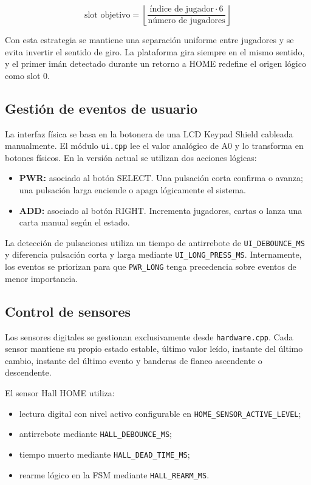 \[
\text{slot objetivo} = \left\lfloor \frac{\text{índice de jugador} \cdot 6}{\text{número de jugadores}} \right\rfloor
\]

Con esta estrategia se mantiene una separación uniforme entre jugadores y se evita invertir el sentido de giro. La plataforma gira siempre en el mismo sentido, y el primer imán detectado durante un retorno a HOME redefine el origen lógico como slot 0.

\subsection{Gestión de eventos de usuario}

La interfaz física se basa en la botonera de una LCD Keypad Shield cableada manualmente. El módulo \texttt{ui.cpp} lee el valor analógico de A0 y lo transforma en botones físicos. En la versión actual se utilizan dos acciones lógicas:

\begin{itemize}
    \item \textbf{PWR:} asociado al botón SELECT. Una pulsación corta confirma o avanza; una pulsación larga enciende o apaga lógicamente el sistema.
    \item \textbf{ADD:} asociado al botón RIGHT. Incrementa jugadores, cartas o lanza una carta manual según el estado.
\end{itemize}

La detección de pulsaciones utiliza un tiempo de antirrebote de \texttt{UI\_DEBOUNCE\_MS} y diferencia pulsación corta y larga mediante \texttt{UI\_LONG\_PRESS\_MS}. Internamente, los eventos se priorizan para que \texttt{PWR\_LONG} tenga precedencia sobre eventos de menor importancia.

\subsection{Control de sensores}

Los sensores digitales se gestionan exclusivamente desde \texttt{hardware.cpp}. Cada sensor mantiene su propio estado estable, último valor leído, instante del último cambio, instante del último evento y banderas de flanco ascendente o descendente.

El sensor Hall HOME utiliza:

\begin{itemize}
    \item lectura digital con nivel activo configurable en \texttt{HOME\_SENSOR\_ACTIVE\_LEVEL};
    \item antirrebote mediante \texttt{HALL\_DEBOUNCE\_MS};
    \item tiempo muerto mediante \texttt{HALL\_DEAD\_TIME\_MS};
    \item rearme lógico en la FSM mediante \texttt{HALL\_REARM\_MS}.
\end{itemize}

